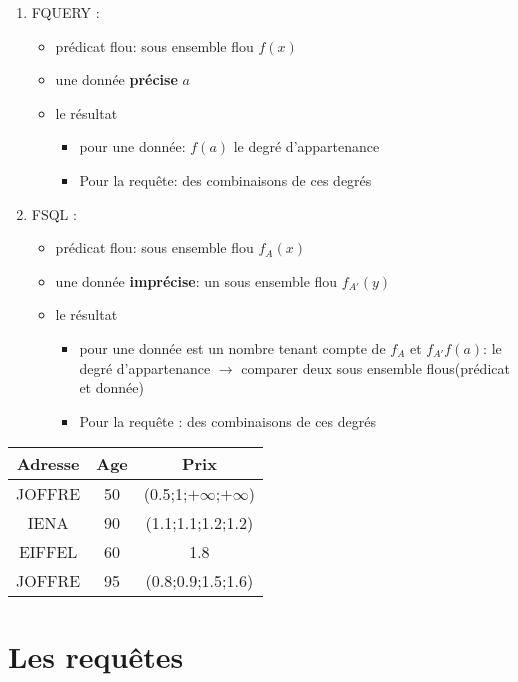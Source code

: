 \documentclass[a4paper,11pt]{article}
\begin{document}
\begin{enumerate}
\item FQUERY : \\
	\begin{itemize}
	\item prédicat flou: sous ensemble flou $f(x)$
	\item une donnée \textbf{précise} $a$
	\item le résultat
	\begin{itemize}
		\item pour une donnée: $f(a)$ le degré d’appartenance
		\item Pour la requête: des combinaisons de ces degrés
	\end{itemize}		
\end{itemize}

\item FSQL : \\
	\begin{itemize}
	\item prédicat flou: sous ensemble flou $f_A(x)$
	\item une donnée \textbf{imprécise}: un sous ensemble flou $f_{A'}(y)$
	\item le résultat
	\begin{itemize}
		\item pour une donnée est un nombre tenant compte de $f_A$ et $f_{A'} f(a)$: le degré d'appartenance $\rightarrow$ comparer deux sous ensemble flous(prédicat et donnée) 
		\item Pour la requête : des combinaisons de ces degrés
	\end{itemize}		
\end{itemize}
\end{enumerate}

\begin{center}
\begin{tabular}{|c|c|c|}
	\hline 
	\textbf{Adresse} & \textbf{Age} & \textbf{Prix} \\ 
	\hline 
	\hline
	JOFFRE & 50 & (0.5;1;$+\infty$;$+\infty$) \\ 
	\hline 
	IENA & 90 & (1.1;1.1;1.2;1.2) \\ 
	\hline 
	EIFFEL & 60 & 1.8 \\ 
	\hline 
	JOFFRE & 95 & (0.8;0.9;1.5;1.6) \\ 
	\hline 
\end{tabular} 
\end{center}

\section{Les requêtes}
\end{document}
